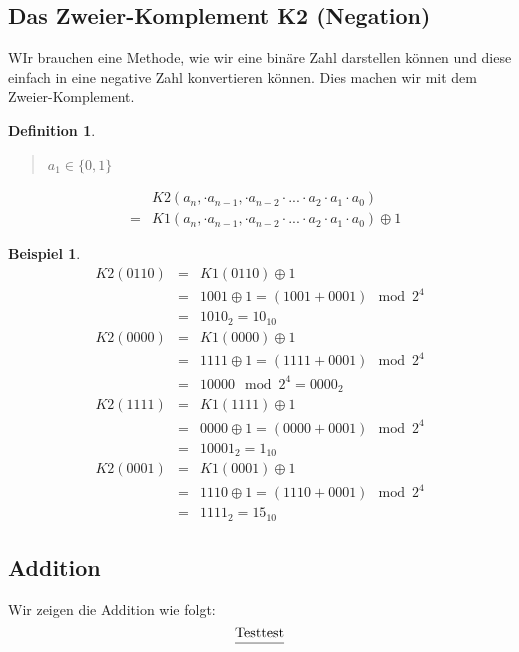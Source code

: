 \documentclass{report}
\newtheorem{mydef}{Definition}
\newtheorem{myexample}{Beispiel}
\begin{document}
\subsection{Das Zweier-Komplement K2 (Negation)}
WIr brauchen eine Methode, wie wir eine binäre Zahl darstellen können und diese einfach in eine negative Zahl konvertieren können. Dies machen wir mit dem Zweier-Komplement.
\begin{mydef}\begin{quote}$a_1 \in \{0, 1\}$\end{quote}\begin{eqnarray}
& &K2(a_n, \cdot a_{n-1}, \cdot a_{n-2} \cdot ... \cdot a_2 \cdot a_1 \cdot a_0) \nonumber \\
&=&K1(a_n, \cdot a_{n-1}, \cdot a_{n-2} \cdot ... \cdot a_2 \cdot a_1 \cdot a_0) \oplus 1 \end{eqnarray}\end{mydef}
\begin{myexample}\begin{eqnarray}K2(0110) &=& K1(0110) \oplus 1 \nonumber \\
&=&1001 \oplus 1 = (1001 + 0001) \mod 2^4 \nonumber \\
&=&1010_2 = 10_{10}\end{eqnarray}
\begin{eqnarray}K2(0000) &=& K1(0000) \oplus 1 \nonumber \\
&=&1111 \oplus 1 = (1111 + 0001) \mod 2^4 \nonumber \\
&=&10000 \mod 2^4 = 0000_2\end{eqnarray}
\begin{eqnarray}K2(1111) &=& K1(1111) \oplus 1 \nonumber \\
&=&0000 \oplus 1 = (0000 + 0001) \mod 2^4 \nonumber \\
&=&10001_2 = 1_{10}\end{eqnarray}
\begin{eqnarray}K2(0001) &=& K1(0001) \oplus 1 \nonumber \\
&=&1110 \oplus 1 = (1110 + 0001) \mod 2^4 \nonumber \\
&=&1111_2 = 15_{10}\end{eqnarray}\end{myexample}
\subsection{Addition}
Wir zeigen die Addition wie folgt:
\begin{equation}\frac{\mbox{Test\\test}}{}\end{equation}
\end{document}
